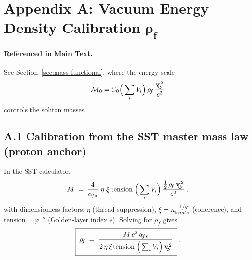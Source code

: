 \documentclass[11pt, preprint,titlepage]{revtex4-2}
\newcommand{\rhoF}{\rho_{\!f}}      %
\newcommand{\swirlarrow}{\!\!\scriptsize\boldsymbol{\circlearrowleft}}
\newcommand{\vswirl}{\mathbf{v}_{\swirlarrow}}
\begin{document}
    
    

    \appendix
	\section*{Appendix A: Vacuum Energy Density Calibration \texorpdfstring{\(\boldsymbol{\rhoF}\)}{rho0}}
	\label{sec:calibration_rho0}

	\paragraph{Referenced in Main Text.}
	See Section~\ref{sec:mass-functional}, where the energy scale
	\[
		\mathcal{M}_0 = C_0 \Big(\sum_i V_i\Big)\,\rhoF\,\frac{\vswirl^{\,2}}{c^2}
	\]
	controls the soliton masses.

	\subsection*{A.1 Calibration from the SST master mass law (proton anchor)}
	In the SST calculator,
	\[
		M \;=\; \frac{4}{\alpha_{\!fs}}\;\eta\;\xi\;\text{tension}\;\Big(\sum_i V_i\Big)\,
		\frac{\tfrac12\,\rhoF\,\vswirl^{\,2}}{c^2}\,,
	\]
	with dimensionless factors:
	\(\eta\) (thread suppression), \(\xi=n_{\textrm knots}^{-1/\varphi}\) (coherence), and \(\text{tension}=\varphi^{-s}\) (Golden-layer index \(s\)).
	Solving for \(\rhoF\) gives
	\begin{equation}
		\boxed{\;
		\rhoF \;=\; \frac{M\,c^2\,\alpha_{\!fs}}
		{2\,\eta\,\xi\,\text{tension}\;\Big(\sum_i V_i\Big)\,\vswirl^{\,2}}\; } \,.
		\label{eq:rho0-solve}
	\end{equation}
\end{document}
